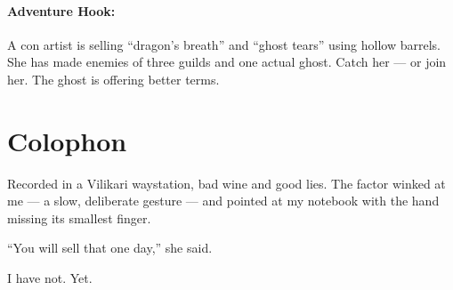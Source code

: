 \paragraph{Adventure Hook:}
A con artist is selling ``dragon's breath'' and ``ghost tears'' using hollow barrels. She has made enemies of three guilds and one actual ghost. Catch her --- or join her. The ghost is offering better terms.

\section*{Colophon}
Recorded in a Vilikari waystation, bad wine and good lies. The factor winked at me --- a slow, deliberate gesture --- and pointed at my notebook with the hand missing its smallest finger.

``You will sell that one day,'' she said.

I have not. Yet.